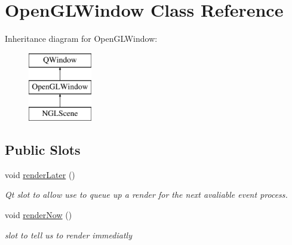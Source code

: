 \hypertarget{classOpenGLWindow}{\section{Open\-G\-L\-Window Class Reference}
\label{classOpenGLWindow}
}
Inheritance diagram for Open\-G\-L\-Window\-:\begin{figure}[H]
\begin{center}
\leavevmode
\includegraphics[height=3.000000cm]{classOpenGLWindow}
\end{center}
\end{figure}
\subsection*{Public Slots}
\begin{DoxyCompactItemize}
\item 
\hypertarget{classOpenGLWindow_abea9e50147496e5110b86f03122fbece}{void \hyperlink{classOpenGLWindow_abea9e50147496e5110b86f03122fbece}{render\-Later} ()}\label{classOpenGLWindow_abea9e50147496e5110b86f03122fbece}

\begin{DoxyCompactList}\small\item\em Qt slot to allow use to queue up a render for the next avaliable event process. \end{DoxyCompactList}\item 
\hypertarget{classOpenGLWindow_a8398ed62d646739fe54fae94c477ad1d}{void \hyperlink{classOpenGLWindow_a8398ed62d646739fe54fae94c477ad1d}{render\-Now} ()}\label{classOpenGLWindow_a8398ed62d646739fe54fae94c477ad1d}

\begin{DoxyCompactList}\small\item\em slot to tell us to render immediatly \end{DoxyCompactList}\end{DoxyCompactItemize}
